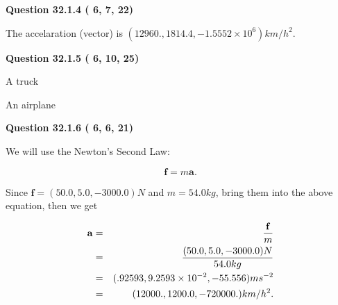 \documentclass[12pt]{article}
\begin{document}
 
 
 
  
\vspace{0.2in}
  
{\textbf{\Large{Question
32.1.4 
 (          6,          7,         22)
}}}
  
  
 
 
\noindent{}
 
 
The accelaration (vector) is
$(
12960.,
1814.4 ,
-1.5552 \times 10^{6}
)km/h^2.
$
 
 
 
 
  
\vspace{0.2in}
  
{\textbf{\Large{Question
32.1.5 
 (          6,         10,         25)
}}}
  
  
 
 
\noindent{}
 
 
A truck
 
 
An airplane
 
 
 
 
  
\vspace{0.2in}
  
{\textbf{\Large{Question
32.1.6 
 (          6,          6,         21)
}}}
  
  
 
 
\noindent{}

We will use the Newton's Second Law:
 
\[
\mathbf{f}=m\mathbf{a}.
\]
 
Since $\mathbf{f}=( %
50.0,  %
5.0,  %
-3000.0 )N$
and $m= %
54.0 kg$, bring them into the above equation, then we get
 
\begin{eqnarray*}
\mathbf{a}&=&\frac{\mathbf{f}}m  \\
&=&\frac{(
50.0 ,
5.0 ,
-3000.0 )N
}{ %
54.0 kg}  \\
&=&(
.92593 ,
9.2593 \times 10^{-2},
-55.556
)ms^{-2} \\
&=&(
12000. ,
1200.0 ,
-720000.
)km/h^2.
\end{eqnarray*}
 
 
 
\end{document}
